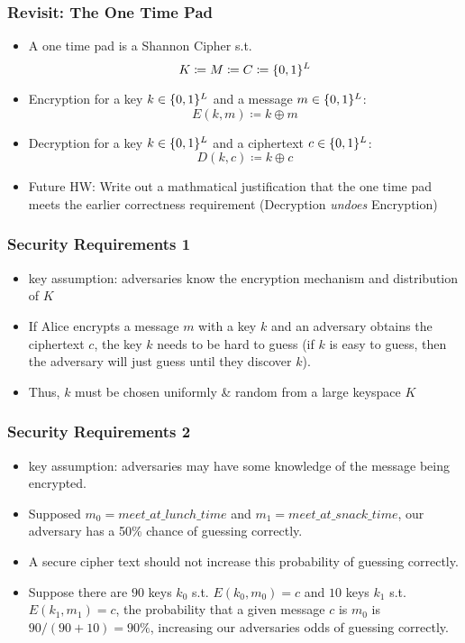 \documentclass{beamer}
\begin{document}
\begin{frame}
\frametitle{Revisit: The One Time Pad}
\begin{itemize}
    \item A one time pad is a Shannon Cipher s.t. \[K \coloneqq M \coloneqq C \coloneqq \{0, 1\}^{\mathnormal{L}} \]\pause
    \item Encryption for a key \(k \in \{0,1\}^{\mathnormal{L}}\) and a message \(m \in \{0,1\}^{\mathnormal{L}}\):\[E(k, m) \coloneqq k \oplus m \]\pause
    \item Decryption for a key \(k \in \{0,1\}^{\mathnormal{L}}\) and a ciphertext \(c \in \{0,1\}^{\mathnormal{L}}\):\[D(k, c) \coloneqq k \oplus c \]\pause
    \item Future HW: Write out a mathmatical justification that the one time pad meets the earlier correctness requirement (Decryption \textit{undoes} Encryption)
\end{itemize}
\end{frame}

\begin{frame}
\frametitle{Security Requirements 1}
\begin{itemize}
    \item key assumption: adversaries know the encryption mechanism and distribution of \(K\)\pause
    \item If Alice encrypts a message \(m\) with a key \(k\) and an adversary obtains the ciphertext \(c\), the key \(k\) needs to be hard to guess \pause (if \(k\) is easy to guess, then the adversary will just guess until they discover \(k\)). \pause
    \item Thus, \(k\) must be chosen uniformly \& random from a large keyspace \(K\) 
\end{itemize}
\end{frame}

\begin{frame}
\frametitle{Security Requirements 2}
\begin{itemize}
    \item key assumption: adversaries may have some knowledge of the message being encrypted. \pause
    \item Supposed \(m_0 = meet\_at\_lunch\_time\) and \(m_1 = meet\_at\_snack\_time\), \pause our adversary has a 50\% chance of guessing correctly. \pause
    \item A secure cipher text should not increase this probability of guessing correctly. \pause
    \item Suppose there are \(90\) keys \(k_0\) s.t. \(E(k_0, m_0) = c\) and \(10\) keys \(k_1\) s.t. \(E(k_1, m_1) = c\), \pause the probability that a given message \(c\) is \(m_0\) is \(90 / (90 + 10) = 90\%\), increasing our adversaries odds of guessing correctly.
\end{itemize}
\end{frame}
\end{document}
